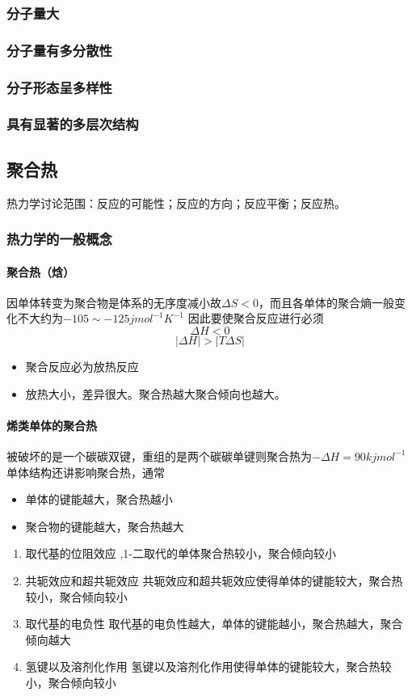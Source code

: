﻿\documentclass[12pt,a4paper]{article}
\begin{document}
\subsubsection{分子量大}
\subsubsection{分子量有多分散性}
\subsubsection{分子形态呈多样性}
\subsubsection{具有显著的多层次结构}
\subsection{聚合热}
热力学讨论范围：反应的可能性；反应的方向；反应平衡；反应热。

\subsubsection{热力学的一般概念}
\paragraph{聚合热（焓）}
因单体转变为聚合物是体系的无序度减小故$\Delta S<0$，而且各单体的聚合熵一般变化不大约为$-105\sim -125jmol^{-1}K^{-1}$
因此要使聚合反应进行必须$$\Delta H<0$$$$
\vert\Delta H\vert>\vert T\Delta S\vert $$
\begin{itemize}
  \item 聚合反应必为放热反应
  \item 放热大小，差异很大。聚合热越大聚合倾向也越大。
\end{itemize}
\paragraph{烯类单体的聚合热}
被破坏的是一个碳碳双键，重组的是两个碳碳单键则聚合热为$-\Delta H =90kj mol^{-1}$
单体结构还讲影响聚合热，通常
\begin{itemize}
  \item 单体的键能越大，聚合热越小
  \item 聚合物的键能越大，聚合热越大
\end{itemize}
\begin{enumerate}[1)]
\item 取代基的位阻效应  
,1-二取代的单体聚合热较小，聚合倾向较小
\item 共轭效应和超共轭效应
\subitem 共轭效应和超共轭效应使得单体的键能较大，聚合热较小，聚合倾向较小
\item 取代基的电负性
\subitem 取代基的电负性越大，单体的键能越小，聚合热越大，聚合倾向越大
\item 氢键以及溶剂化作用
\subitem 氢键以及溶剂化作用使得单体的键能较大，聚合热较小，聚合倾向较小
\end{enumerate}
\end{document}
